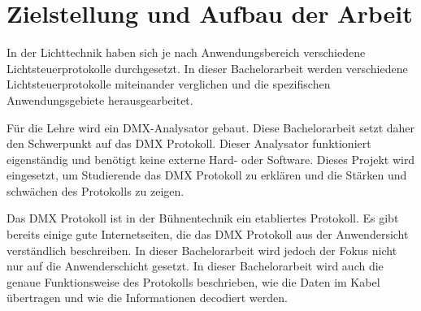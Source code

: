\chapter{Zielstellung und Aufbau der Arbeit}

In der Lichttechnik haben sich je nach Anwendungsbereich verschiedene Lichtsteuerprotokolle durchgesetzt. In dieser Bachelorarbeit werden verschiedene Lichtsteuerprotokolle miteinander verglichen und die spezifischen Anwendungsgebiete herausgearbeitet.

Für die Lehre wird ein DMX-Analysator gebaut. Diese Bachelorarbeit setzt daher den Schwerpunkt auf das DMX Protokoll. Dieser Analysator funktioniert eigenständig und benötigt keine externe Hard- oder Software. Dieses Projekt wird eingesetzt, um Studierende das DMX Protokoll zu erklären und die Stärken und schwächen des Protokolls zu zeigen.

Das DMX Protokoll ist in der Bühnentechnik ein etabliertes Protokoll. Es gibt bereits einige gute Internetseiten, die das DMX Protokoll aus der Anwendersicht verständlich beschreiben. In dieser Bachelorarbeit wird jedoch der Fokus nicht nur auf die Anwenderschicht gesetzt. In dieser Bachelorarbeit wird auch die genaue Funktionsweise des Protokolls beschrieben, wie die Daten im Kabel übertragen und wie die Informationen decodiert werden.